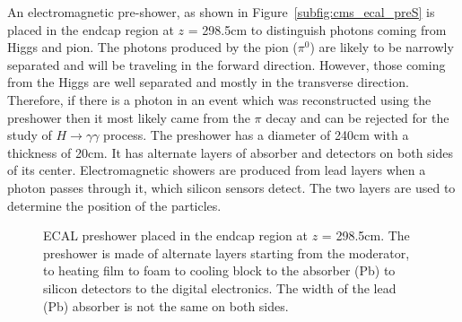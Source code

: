 An electromagnetic pre-shower, as shown in Figure~\ref{subfig:cms_ecal_preS} is placed
in the endcap region at $z$ = 298.5\unit{cm} to distinguish photons coming from Higgs and pion.
The photons produced by the pion ($\pi^0$) are likely to be narrowly separated and
will be traveling in the forward direction. However, those coming from the Higgs 
are well separated and mostly in the transverse direction. Therefore, if
there is a photon in an event which was reconstructed using the preshower then
it most likely came from the $\pi$ decay and can be rejected for the study of
$H \rightarrow \gamma \gamma$ process.
The preshower has a diameter of 240\unit{cm} with a thickness of 20\unit{cm}. It 
has alternate layers of absorber and detectors on both sides of its center. 
Electromagnetic showers are produced from lead layers when a photon passes through it, 
which silicon sensors detect. The two layers are used to determine the position of the 
particles. 
\begin{figure}
  \centering
  \hfil
  \caption{ECAL preshower \cite{preS} placed in the endcap region at $z$ = 298.5\unit{cm}. The 
	preshower is made of alternate layers starting from the moderator, to 
	heating film to foam to cooling block to the absorber (Pb) to silicon
	detectors to the digital electronics. The width of the lead (Pb) absorber
	is not the same on both sides.}
  \label{fig:cms_ecal_pre}
\end{figure}

